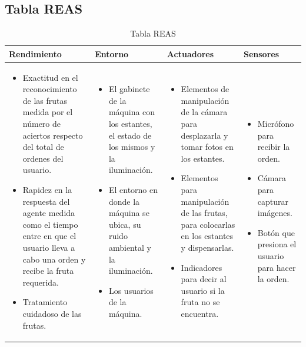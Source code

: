 \documentclass[a4paper, 12pt]{article}
\begin{document}
\subsection{Tabla REAS}
\begin{table}[htbp]
    \centering
    \begin{tabular}{|p{3.5cm}|p{3.5cm}|p{3.5cm}|p{3.5cm}|}
        \hline
        \textbf{Rendimiento} & \textbf{Entorno} & \textbf{Actuadores} & \textbf{Sensores} \\
        \hline
        \begin{itemize}[left=0pt, itemsep=-2pt]
            \item Exactitud en el reconocimiento de las frutas medida por el número de aciertos respecto del total de ordenes del usuario.
            \item Rapidez en la respuesta del agente medida como el tiempo entre en que el usuario lleva a cabo una orden y recibe la fruta requerida.
            \item Tratamiento cuidadoso de las frutas.
        \end{itemize} & 
        \begin{itemize}[left=0pt, itemsep=-2pt]
            \item El gabinete de la máquina con los estantes, el estado de los mismos y la iluminación.
            \item El entorno en donde la máquina se ubica, su ruido ambiental y la iluminación.
            \item Los usuarios de la máquina.
        \end{itemize} & 
        \begin{itemize}[left=0pt, itemsep=-2pt]
            \item Elementos de manipulación de la cámara para desplazarla y tomar fotos en los estantes.
            \item Elementos para manipulación de las frutas, para colocarlas en los estantes y dispensarlas.
            \item Indicadores para decir al usuario si la fruta no se encuentra.
        \end{itemize} & 
        \begin{itemize}[left=0pt]
            \item Micrófono para recibir la orden.
            \item Cámara para capturar imágenes.
            \item Botón que presiona el usuario para hacer la orden.
        \end{itemize} \\
        \hline
    \end{tabular}
    \caption{Tabla REAS}
    \label{tabla:ejemplo}
\end{table}
\end{document}
